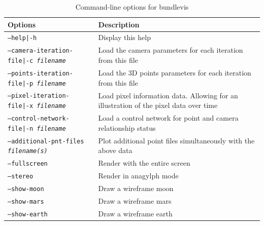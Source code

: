 \begin{longtable}{|l|p{10cm}|}
\caption{Command-line options for bundlevis}
\label{tbl:bundlevis}
\endfirsthead
\endhead
\endfoot
\endlastfoot
\hline
Options & Description \\ \hline \hline
\texttt{--help|-h} & Display this help \\ \hline
\texttt{--camera-iteration-file|-c \textit{filename}} & Load the camera parameters for each iteration from this file \\ \hline
\texttt{--points-iteration-file|-p \textit{filename}} & Load the 3D points parameters for each iteration from this file \\ \hline
\texttt{--pixel-iteration-file|-x \textit{filename}} & Load pixel information data. Allowing for an illustration of the pixel data over time \\ \hline
\texttt{--control-network-file|-n \textit{filename}} & Load a control network for point and camera relationship status \\ \hline
\texttt{--additional-pnt-files \textit{filename(s)}} & Plot additional point files simultaneously with the above data \\ \hline
\texttt{--fullscreen} & Render with the entire screen \\ \hline
\texttt{--stereo} & Render in anagylph mode \\ \hline
\texttt{--show-moon} & Draw a wireframe moon \\ \hline
\texttt{--show-mars} & Draw a wireframe mars \\ \hline
\texttt{--show-earth} & Draw a wireframe earth \\ \hline
\end{longtable}









